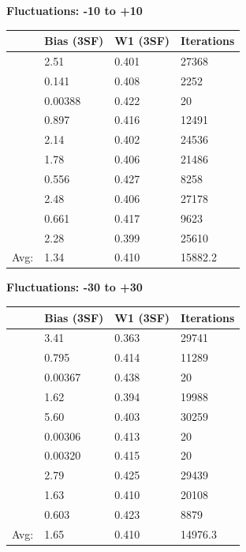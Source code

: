 \documentclass{article}
\begin{document}
\begin{center}
    \textbf{Fluctuations: -10 to +10}        \\
    \begin{tabular}{ r | l | l | l }
        \hline
        & Bias (3SF) & W1 (3SF) & Iterations \\
        \hline
        & 2.51       & 0.401    & 27368      \\
        & 0.141      & 0.408    & 2252       \\
        & 0.00388    & 0.422    & 20         \\
        & 0.897      & 0.416    & 12491      \\
        & 2.14       & 0.402    & 24536      \\
        & 1.78       & 0.406    & 21486      \\
        & 0.556      & 0.427    & 8258       \\
        & 2.48       & 0.406    & 27178      \\
        & 0.661      & 0.417    & 9623       \\
        & 2.28       & 0.399    & 25610      \\
        \hline
   Avg: & 1.34       & 0.410    & 15882.2    \\
        \hline
    \end{tabular}
\end{center}
\vspace{5mm}
\begin{center}
    \textbf{Fluctuations: -30 to +30}        \\
    \begin{tabular}{ r | l | l | l }
        \hline
        & Bias (3SF) & W1 (3SF) & Iterations \\
        \hline
        & 3.41       & 0.363    & 29741      \\
        & 0.795      & 0.414    & 11289      \\
        & 0.00367    & 0.438    & 20         \\
        & 1.62       & 0.394    & 19988      \\
        & 5.60       & 0.403    & 30259      \\
        & 0.00306    & 0.413    & 20         \\
        & 0.00320    & 0.415    & 20         \\
        & 2.79       & 0.425    & 29439      \\
        & 1.63       & 0.410    & 20108      \\
        & 0.603      & 0.423    & 8879       \\
        \hline
   Avg: & 1.65       & 0.410    & 14976.3    \\
        \hline
    \end{tabular}
\end{center}
\end{document}

